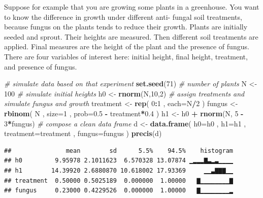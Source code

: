 \documentclass[
]{article}
\newenvironment{Shaded}{\begin{snugshade}}{\end{snugshade}}
\newcommand{\CommentTok}[1]{\textcolor[rgb]{0.56,0.35,0.01}{\textit{#1}}}
\newcommand{\DataTypeTok}[1]{\textcolor[rgb]{0.13,0.29,0.53}{#1}}
\newcommand{\DecValTok}[1]{\textcolor[rgb]{0.00,0.00,0.81}{#1}}
\newcommand{\FloatTok}[1]{\textcolor[rgb]{0.00,0.00,0.81}{#1}}
\newcommand{\KeywordTok}[1]{\textcolor[rgb]{0.13,0.29,0.53}{\textbf{#1}}}
\newcommand{\NormalTok}[1]{#1}
\newcommand{\OperatorTok}[1]{\textcolor[rgb]{0.81,0.36,0.00}{\textbf{#1}}}
\newcommand{\StringTok}[1]{\textcolor[rgb]{0.31,0.60,0.02}{#1}}
\begin{document}
Suppose for example that you are growing some plants in a greenhouse.
You want to know the difference in growth under different anti- fungal
soil treatments, because fungus on the plants tends to reduce their
growth. Plants are initially seeded and sprout. Their heights are
measured. Then different soil treatments are applied. Final measures are
the height of the plant and the presence of fungus. There are four
variables of interest here: initial height, final height, treatment, and
presence of fungus.

\begin{Shaded}
\begin{Highlighting}[]
\CommentTok{# simulate data based on that experiment}
\KeywordTok{set.seed}\NormalTok{(}\DecValTok{71}\NormalTok{)}
\CommentTok{# number of plants }
\NormalTok{N <-}\StringTok{ }\DecValTok{100}
\CommentTok{# simulate initial heights }
\NormalTok{h0 <-}\StringTok{ }\KeywordTok{rnorm}\NormalTok{(N,}\DecValTok{10}\NormalTok{,}\DecValTok{2}\NormalTok{)}
\CommentTok{# assign treatments and simulate fungus and growth }
\NormalTok{treatment <-}\StringTok{ }\KeywordTok{rep}\NormalTok{( }\DecValTok{0}\OperatorTok{:}\DecValTok{1}\NormalTok{ , }\DataTypeTok{each=}\NormalTok{N}\OperatorTok{/}\DecValTok{2}\NormalTok{ )}
\NormalTok{fungus <-}\StringTok{ }\KeywordTok{rbinom}\NormalTok{( N , }\DataTypeTok{size=}\DecValTok{1}\NormalTok{ , }\DataTypeTok{prob=}\FloatTok{0.5} \OperatorTok{-}\StringTok{ }\NormalTok{treatment}\OperatorTok{*}\FloatTok{0.4}\NormalTok{ ) }
\NormalTok{h1 <-}\StringTok{ }\NormalTok{h0 }\OperatorTok{+}\StringTok{ }\KeywordTok{rnorm}\NormalTok{(N, }\DecValTok{5} \OperatorTok{-}\StringTok{ }\DecValTok{3}\OperatorTok{*}\NormalTok{fungus)}
\CommentTok{# compose a clean data frame}
\NormalTok{d <-}\StringTok{ }\KeywordTok{data.frame}\NormalTok{( }\DataTypeTok{h0=}\NormalTok{h0 , }\DataTypeTok{h1=}\NormalTok{h1 , }\DataTypeTok{treatment=}\NormalTok{treatment , }\DataTypeTok{fungus=}\NormalTok{fungus ) }
\KeywordTok{precis}\NormalTok{(d)}
\end{Highlighting}
\end{Shaded}

\begin{verbatim}
##               mean        sd      5.5%    94.5%    histogram
## h0         9.95978 2.1011623  6.570328 13.07874 ▁▂▂▂▇▃▂▃▁▁▁▁
## h1        14.39920 2.6880870 10.618002 17.93369     ▁▁▃▇▇▇▁▁
## treatment  0.50000 0.5025189  0.000000  1.00000   ▇▁▁▁▁▁▁▁▁▇
## fungus     0.23000 0.4229526  0.000000  1.00000   ▇▁▁▁▁▁▁▁▁▂
\end{verbatim}
\end{document}
